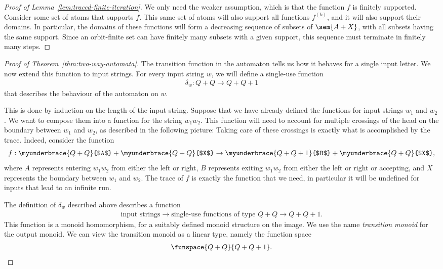\begin{proof}[Proof of Lemma~\ref{lem:traced-finite-iteration}]
    We only need the weaker assumption, which is that the function $f$ is finitely supported. Consider some set of atoms that supports $f$. This same set of atoms will also support all functions $f^{(k)}$, and it will also support their domains. In particular, the domains of these functions will form a decreasing sequence of subsets of $\sem{A + X}$, with all subsets having the same support. Since an orbit-finite set can have finitely many subsets with a given support, this sequence must terminate in finitely many steps.
\end{proof} 

\begin{proof}[Proof of Theorem~\ref{thm:two-way-automata}]
    The transition function in the automaton tells us how it behaves for a single input letter. We now extend this function to input strings.    For every input string $w$, we will define  a single-use function 
    \begin{align*}
       \delta_w :  Q+Q \to Q + Q + 1
    \end{align*}
    that describes the behaviour of the automaton on $w$. 
    
    This is done by induction on the length of the input string. Suppose that we have already defined the functions for  input strings $w_1$ and $w_2$.
    We want to compose them into a function for the string $w_1 w_2$. This function will need to account for multiple crossings of the head on the boundary between $w_1$ and $w_2$, as described in the following picture: 
    Taking care of these crossings is exactly what is accomplished by the trace. Indeed, consider the function 
        \begin{align*}
            f : \myunderbrace{Q+Q}{$A$} + \myunderbrace{Q+Q}{$X$} \to \myunderbrace{Q+Q + 1}{$B$} + \myunderbrace{Q+Q}{$X$},
        \end{align*}
        where $A$ represents entering $w_1 w_2$ from either the left or right, $B$ represents exiting $w_1 w_2$ from either the left or right or accepting,  and $X$ represents the boundary between $w_1$ and $w_2$. The trace of $f$ is exactly the function that we need, in particular it will be undefined for inputs that lead to an infinite run.


        The definition of $\delta_w$ described above describes a function 
        \begin{align*}
        \text{input strings} \to \text{single-use functions of type }Q+Q \to Q + Q + 1.
        \end{align*}
        This function is a monoid homomorphism, for a suitably defined  monoid structure on the image. We use the name \emph{transition monoid} for the output monoid. We can view the transition monoid  as a linear type, namely the function space 
        \begin{align*}
        \funspace {Q+Q} {Q + Q + 1}.
        \end{align*}


\end{proof}
